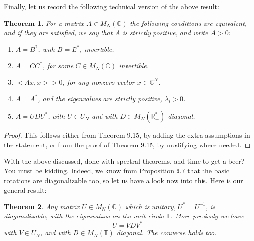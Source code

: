\documentclass[12pt]{amsbook}
\newtheorem{theorem}{Theorem}[chapter]
\begin{document}
Finally, let us record the following technical version of the above result:

\begin{theorem}
For a matrix $A\in M_N(\mathbb C)$ the following conditions are equivalent, and if they are satisfied, we say that $A$ is strictly positive, and write $A>0$:
\begin{enumerate}
\item $A=B^2$, with $B=B^*$, invertible.

\item $A=CC^*$, for some $C\in M_N(\mathbb C)$ invertible.

\item $<Ax,x>>0$, for any nonzero vector $x\in\mathbb C^N$.

\item $A=A^*$, and the eigenvalues are strictly positive, $\lambda_i>0$.

\item $A=UDU^*$, with $U\in U_N$ and with $D\in M_N(\mathbb R_+^*)$ diagonal.
\end{enumerate}
\end{theorem}

\begin{proof}
This follows either from Theorem 9.15, by adding the extra assumptions in the statement, or from the proof of Theorem 9.15, by modifying where needed.
\end{proof}

With the above discussed, done with spectral theorems, and time to get a beer? You must be kidding. Indeed, we know from Proposition 9.7 that the basic rotations are diagonalizable too, so let us have a look now into this. Here is our general result:

\begin{theorem}
Any matrix $U\in M_N(\mathbb C)$ which is unitary, $U^*=U^{-1}$, is diagonalizable, with the eigenvalues on the unit circle $\mathbb T$. More precisely we have
$$U=VDV^*$$
with $V\in U_N$, and with $D\in M_N(\mathbb T)$ diagonal. The converse holds too.
\end{theorem}
\end{document}
